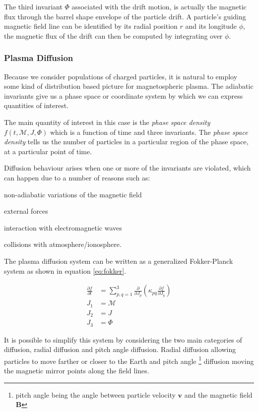 The third invariant $\Phi$ associated with the drift motion, is actually the magnetic flux through the barrel 
shape envelope of the particle drift. A particle's guiding magnetic field line can be identified by its radial 
position $r$ and its longitude $\phi$, the magnetic flux of the drift can then be computed by integrating over 
$\phi$.

\subsubsection*{Plasma Diffusion}

Because we consider populations of charged particles, it is natural to employ some kind of distribution based 
picture for magnetospheric plasma. The adiabatic invariants give us a phase space or coordinate system by which 
we can express quantities of interest. 

The main quantity of interest in this case is the \emph{phase space density} $f(t, \mathcal{M}, J, \Phi)$ which 
is a function of time and three invariants. The \emph{phase space density} tells us the number of particles in 
a particular region of the phase space, at a particular point of time.

Diffusion behaviour arises when one or more of the invariants are violated, which can happen due to a number of 
reasons such as: 
\begin{enumerate*}
    \item non-adiabatic variations of the magnetic field 
    \item external forces
    \item interaction with electromagnetic waves
    \item collisions with atmosphere/ionosphere. 
\end{enumerate*}

The plasma diffusion system \citep{schulz2012particle} can be written as a generalized Fokker-Planck system as shown 
in equation \ref{eq:fokker}.

\begin{align}\label{eq:fokker}
    \frac{\partial{f}}{\partial{t}} &= \sum^{3}_{p,q = 1}
    \frac{\partial}{\partial{J_{p}}} \left( \kappa_{pq}
    \frac{\partial{f}}{\partial{J_{q}}} \right) \\
    J_1 &= \mathcal{M} \\
    J_2 &= J \\
    J_{3} &= \Phi
\end{align}

It is possible to simplify this system by considering the two main categories of diffusion, radial diffusion and 
pitch angle diffusion. Radial diffusion allowing particles to move farther or closer to the Earth and pitch angle 
\footnote{pitch angle being the angle between particle velocity $\mathbf{v}$ and the magnetic field $\mathbf{B}$} 
diffusion moving the magnetic mirror points along the field lines.

